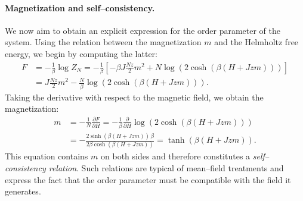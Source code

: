 \paragraph{Magnetization and self–consistency.}
We now aim to obtain an explicit expression for the order parameter of the system. Using the relation between the magnetization \(m\) and the Helmholtz free energy, we begin by computing the latter:
\[
    \begin{aligned}
        F & = -\frac{1}{\beta}\log Z_N
        = -\frac{1}{\beta}\left[-\beta J\frac{Nz}{2}m^2 + N\log\!\left(2\cosh(\beta(H+Jzm))\right)\right] \\
          & = J\frac{Nz}{2}m^2 - \frac{N}{\beta}\log\!\left(2\cosh(\beta(H+Jzm))\right).
    \end{aligned}
\]
Taking the derivative with respect to the magnetic field, we obtain the magnetization:
\[
    \begin{aligned}
        m & = -\frac{1}{N}\frac{\partial F}{\partial H}
        = -\frac{1}{\beta}\frac{\partial}{\partial H}
        \log(2\cosh(\beta(H+Jzm)))                                           \\
          & = -\frac{2\sinh(\beta(H+Jzm))\,\beta}{2\beta\cosh(\beta(H+Jzm))}
        = \tanh(\beta(H+Jzm)).
    \end{aligned}
\]
This equation contains \(m\) on both sides and therefore constitutes a \textit{self–consistency relation}. Such relations are typical of mean–field treatments and express the fact that the order parameter must be compatible with the field it generates.

